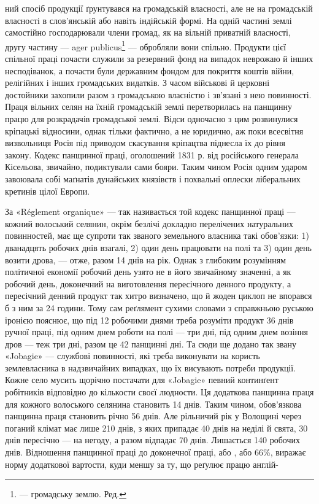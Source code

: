ний спосіб продукції ґрунтувався на громадській власності, але
не на громадській власності в слов’янській або навіть індійській
формі. На одній частині землі самостійно господарювали члени
громад, як на вільній приватній власності, другу частину — ager
publicus\footnote*{
— громадську землю. Ред.
} — обробляли вони спільно. Продукти цієї спільної праці
почасти служили за резервний фонд на випадок неврожаю й інших
несподіванок, а почасти були державним фондом для покриття
коштів війни, релігійних і інших громадських видатків. З часом
військові й церковні достойники захопили разом з громадською
власністю і зв’язані з нею повинності. Праця вільних селян на
їхній громадській землі перетворилась на панщинну працю для
розкрадачів громадської землі. Відси одночасно з цим розвинулися
кріпацькі відносини, однак тільки фактично, а не юридично,
аж поки всесвітня визвольниця Росія під приводом скасування
кріпацтва піднесла їх до рівня закону. Кодекс панщинної праці,
оголошений 1831 р. від російського генерала Кісельова, звичайно,
подиктували сами бояри. Таким чином Росія одним ударом завоювала
собі маґнатів дунайських князівств і похвальні оплески
ліберальних кретинів цілої Европи.

За «Réglement organique» — так називається той кодекс панщинної
праці — кожний волоський селянин, окрім безлічі докладно
перелічених натуральних повинностей, має ще супроти так
званого земельного власника такі обов’язки: 1) дванадцять робочих
днів взагалі, 2) один день працювати на полі та 3) один день
возити дрова, — отже, разом 14 днів на рік. Однак з глибоким розумінням
політичної економії робочий день узято не в його звичайному
значенні, а як робочий день, доконечний на виготовлення
пересічного денного продукту, а пересічний денний продукт так
хитро визначено, що й жоден циклоп не впорався б з ним за
24 години. Тому сам реґлямент сухими словами з справжньою
руською іронією пояснює, що під 12 робочими днями треба розуміти
продукт 36 днів ручної праці, під одним днем роботи на полі —
три дні, під одним днем возіння дров — теж три дні, разом це
42 панщинні дні. Та сюди ще додано так звану «Jobagie» — службові
повинності, які треба виконувати на користь землевласника
в надзвичайних випадках, що їх висувають потреби продукції.
Кожне село мусить щорічно постачати для «Jobagie» певний
континґент робітників відповідно до кількости своєї людности.
Ця додаткова панщинна праця для кожного волоського селянина
становить 14 днів. Таким чином, обов’язкова панщинна праця
становить річно 56 днів. Але рільничий рік у Волощині через
поганий клімат має лише 210 днів, з яких припадає 40 днів на
неділі й свята, 30 днів пересічно — на негоду, а разом відпадає
70 днів. Лишається 140 робочих днів. Відношення панщинної
праці до доконечної праці, або , або 66\%, виражає норму додаткової
вартости, куди меншу за ту, що реґулює працю англій-